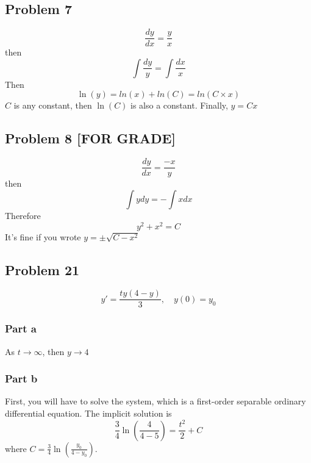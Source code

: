 \documentclass[12pt]{article}
\begin{document}
\subsection*{Problem 7}
\label{sec:org9a91f82}
\begin{equation*}
  \frac{dy}{dx} = \frac{y}{x}
\end{equation*}
then
\begin{equation*}
        \int \frac{dy}{y} = \int \frac{dx}{x}
\end{equation*}
Then
\begin{equation*}
        \ln(y) = ln(x) + ln(C) = ln(C\times x)
\end{equation*}
\(C\) is any constant, then \(\ln(C)\) is also a constant.
Finally, \(y = Cx\)
\subsection*{Problem 8 [FOR GRADE]}
\label{sec:org41123d5}
\begin{equation*}
        \frac{dy}{dx} = \frac{-x}{y}
\end{equation*}
then
\begin{equation*}
        \int y dy = - \int x dx
\end{equation*}
Therefore
\begin{equation*}
        y^2 + x^2 = C
\end{equation*}
It's fine if you wrote \(y = \pm \sqrt{C - x^2}\)
\subsection*{Problem 21}
\label{sec:orga47c794}
\begin{equation*}
        y' = \frac{ty(4-y)}{3}, \quad y(0) = y_0
\end{equation*}
\subsubsection*{Part a}
\label{sec:org1d3d331}
As \(t \to \infty\), then \(y \to 4\)
\subsubsection*{Part b}
\label{sec:org0099540}
First, you will have to solve the system, which is a first-order separable
ordinary differential equation.  The implicit solution is
\begin{equation*}
        \frac{3}{4} \ln(\frac{4}{4-5}) = \frac{t^2}{2} + C
\end{equation*}
where \(C = \frac{3}{4} \ln(\frac{y_0}{4-y_0})\).
\end{document}
